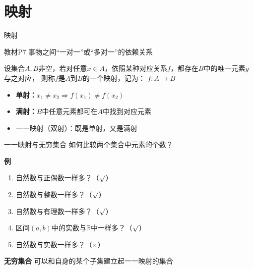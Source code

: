 \section{映射}

\begin{frame}{映射}
	\linespread{1.2}\pause 
	\begin{block}{教材P7}
		事物之间“一对一”或“多对一”的依赖关系
	\end{block}\pause 
	设集合$A,B$非空，\pause 若对任意$x\in
	A$，\pause 依照某种对应关系$f$，\pause 都存在$B$中的唯一元素$y$与之对应，\pause
	则称$f$是$A$到$B$的一个映射，\pause 记为： $f:A\to B$
	\begin{itemize}\pause 
	  \item {\bf 单射：\pause }$x_1\ne x_2\Rightarrow f(x_1)\ne f(x_2)$
	  \item {\bf 满射：\pause }$B$中任意元素都可在$A$中找到对应元素
	  \item {\bb 一一映射（双射）：\pause }既是单射，又是满射
	\end{itemize}
\end{frame}

\begin{frame}{一一映射与无穷集合}
	\linespread{1.2}\pause 
	{}如何比较两个集合中元素的个数？\pause 
	\begin{exampleblock}{\bf 例}
		\begin{enumerate}\pause 
		  \item 自然数与正偶数一样多？\pause （\alert{$\surd$}）\pause 
		  \item 自然数与整数一样多？\pause （\alert{$\surd$}）\pause 
		  \item 自然数与有理数一样多？\pause （\alert{$\surd$}）\pause 
		  \item 区间$(a,b)$中的实数与$\mathbb{R}$中一样多？\pause （\alert{$\surd$}）\pause 
		  \item 自然数与实数一样多？\pause （\alert{$\times$}）\pause 
		\end{enumerate}
	\end{exampleblock}\pause
	\begin{alertblock}{\bf 无穷集合}\pause 
		可以和自身的某个子集建立起一一映射的集合
	\end{alertblock}
\end{frame}

